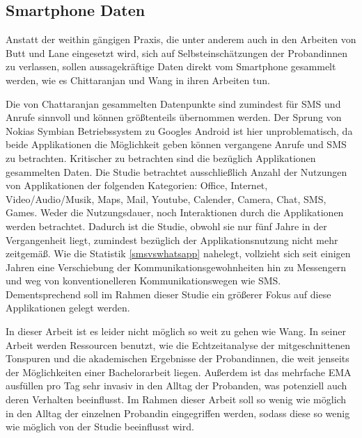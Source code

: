 \subsection{Smartphone Daten}

Anstatt der weithin gängigen Praxis, die unter anderem auch in den Arbeiten von Butt \cite{butt2008personality} und Lane \cite{lane2011impact}
eingesetzt wird, sich auf Selbsteinschätzungen der Probandinnen zu verlassen, sollen aussagekräftige Daten direkt vom Smartphone gesammelt werden, 
wie es Chittaranjan \cite{chittaranjan2011s} und Wang \cite{wang2014istudentlife} in ihren Arbeiten tun.
\par
Die von Chattaranjan gesammelten Datenpunkte sind zumindest für SMS und Anrufe sinnvoll und können größtenteils übernommen werden.
Der Sprung von Nokias Symbian Betriebssystem zu Googles Android ist hier unproblematisch, da beide Applikationen die Möglichkeit geben können
vergangene Anrufe und SMS zu betrachten.
Kritischer zu betrachten sind die bezüglich Applikationen gesammelten Daten.
Die Studie betrachtet ausschließlich Anzahl der Nutzungen von Applikationen der folgenden Kategorien:
Office, Internet, Video/Audio/Musik, Maps, Mail, Youtube, Calender, Camera, Chat, SMS, Games.
Weder die Nutzungsdauer, noch Interaktionen durch die Applikationen werden betrachtet. 
Dadurch ist die Studie, obwohl sie nur fünf Jahre in der Vergangenheit liegt, zumindest bezüglich der Applikationsnutzung nicht mehr zeitgemäß.
Wie die Statistik \ref{smsvswhatsapp} nahelegt, vollzieht sich seit einigen Jahren eine Verschiebung der Kommunikationsgewohnheiten hin zu Messengern und weg von konventionelleren Kommunikationswegen wie SMS.
Dementsprechend soll im Rahmen dieser Studie ein größerer Fokus auf diese Applikationen gelegt werden.
\par
In dieser Arbeit ist es leider nicht möglich so weit zu gehen wie Wang.
In seiner Arbeit werden Ressourcen benutzt, wie die Echtzeitanalyse der mitgeschnittenen Tonspuren und die akademischen Ergebnisse der Probandinnen, die weit jenseits der Möglichkeiten einer Bachelorarbeit liegen.
Außerdem ist das mehrfache EMA ausfüllen pro Tag sehr invasiv in den Alltag der Probanden, was potenziell auch deren Verhalten beeinflusst.
Im Rahmen dieser Arbeit soll so wenig wie möglich in den Alltag der einzelnen Probandin eingegriffen werden, sodass diese so wenig wie möglich von der Studie beeinflusst wird.


